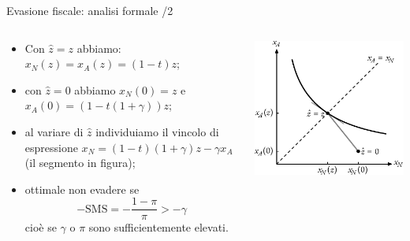 \documentclass[aspectratio=64,12pt]{beamer}
\begin{document}
\begin{frame}{Evasione fiscale: analisi formale /2}
\begin{columns}
\begin{column}{.45\columnwidth}
\begin{itemize}
\item Con $\hat{z}=z$ abbiamo: $x_N(z)=x_A(z)=(1-t)z$;
\item con $\hat{z}=0$ abbiamo $x_N(0)=z$ e $x_A(0)=(1-t(1+\gamma))z$;
\item al variare di $\hat{z}$ individuiamo il vincolo di espressione $x_N=(1-t)(1+\gamma)z-\gamma x_A$\\
  (il segmento in figura);
\item ottimale non evadere se
$$ -\text{SMS}=-\frac{1-\pi}{\pi} >-\gamma $$
cioè se $\gamma$ o $\pi$ sono sufficientemente elevati.
\end{itemize}
\end{column}
\begin{column}{.55\columnwidth}
\begin{center}
\includegraphics[width=\textwidth]{./figure/evasione-1.pdf}
\end{center}
\end{column}
\end{columns}
\end{frame}
\end{document}

